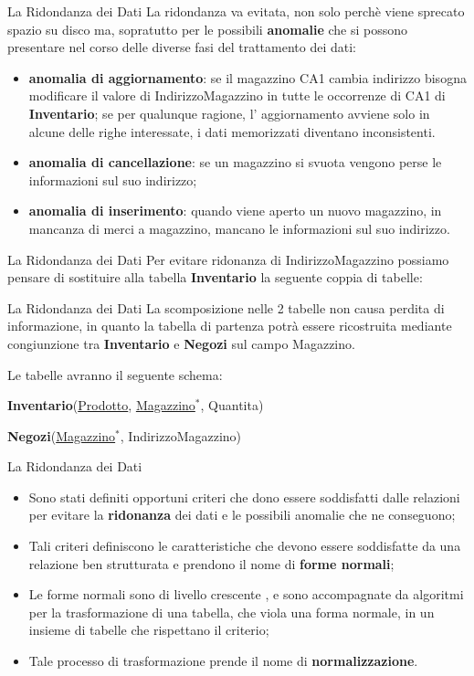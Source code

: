 %
\begin{frame}{La Ridondanza dei Dati}
La ridondanza va evitata, non solo perch\`e viene sprecato spazio su disco ma, sopratutto per le possibili \textbf{anomalie} che si possono presentare nel corso delle diverse fasi del trattamento dei dati:
\pause
\begin{itemize}[<+->]
    \item \textbf{anomalia di aggiornamento}: se il magazzino CA1 cambia indirizzo bisogna modificare il valore di IndirizzoMagazzino in tutte le occorrenze di CA1 di \textbf{Inventario}; se per qualunque ragione, l' aggiornamento avviene solo in alcune delle righe interessate, i dati memorizzati diventano inconsistenti.
    \item \textbf{anomalia di cancellazione}: se un magazzino si svuota vengono perse le informazioni sul suo indirizzo;
    \item \textbf{anomalia di inserimento}: quando viene aperto un nuovo magazzino, in mancanza di merci a magazzino, mancano le informazioni sul suo indirizzo.
\end{itemize}
\end{frame}
%
\begin{frame}{La Ridondanza dei Dati}
Per evitare ridonanza di IndirizzoMagazzino possiamo pensare di sostituire alla tabella \textbf{Inventario} la seguente coppia di tabelle:
\pause
\vspace{.2cm}

\InventarioNegozi
\end{frame}
%
\begin{frame}{La Ridondanza dei Dati}
La scomposizione nelle 2 tabelle non causa perdita di informazione, in quanto la tabella di partenza potr\`a essere ricostruita mediante congiunzione tra \textbf{Inventario} e \textbf{Negozi} sul campo Magazzino.
\pause

Le tabelle avranno il seguente schema:

\pause
\textbf{Inventario}(\underline{Prodotto}, \underline{Magazzino}$^*$, Quantita)\\
\pause

\textbf{Negozi}(\underline{Magazzino}$^*$, IndirizzoMagazzino)
\end{frame}
%
\begin{frame}{La Ridondanza dei Dati}
\begin{itemize}[<+->]
    \item Sono stati definiti opportuni criteri che dono essere soddisfatti dalle relazioni per evitare la \textbf{ridonanza} dei dati e le possibili anomalie che ne conseguono;
    \item Tali criteri definiscono le caratteristiche che devono essere soddisfatte da una relazione ben strutturata e prendono il nome di \textbf{forme normali};
    \item Le forme normali sono di livello crescente , e sono accompagnate da algoritmi per la trasformazione di una tabella, che viola una forma normale, in un insieme di tabelle che rispettano il criterio;
    \item Tale processo di trasformazione prende il nome di \textbf{normalizzazione}.
\end{itemize}
\end{frame}
